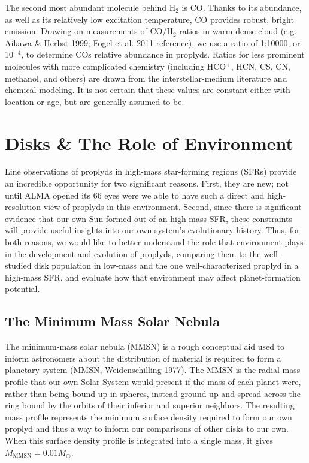 The second most abundant molecule behind H$_2$ is CO. Thanks to its abundance, as well as its relatively low excitation temperature, CO provides robust, bright emission. Drawing on measurements of CO/H$_2$ ratios in warm dense cloud (e.g. Aikawa & Herbst 1999; Fogel et al. 2011 reference), we use a ratio of 1:10000, or 10$^{-4}$, to determine COs relative abundance in proplyds. Ratios for less prominent molecules with more complicated chemistry (including HCO$^+$, HCN, CS, CN, methanol, and others) are drawn from the interstellar-medium literature and chemical modeling. It is not certain that these values are constant either with location or age, but are generally assumed to be.




\section{Disks \& The Role of Environment}

Line observations of proplyds in high-mass star-forming regions (SFRs) provide an incredible opportunity for two significant reasons. First, they are new; not until ALMA opened its 66 eyes were we able to have such a direct and high-resolution view of proplyds in this environment. Second, since there is significant evidence that our own Sun formed out of an high-mass SFR, these constraints will provide useful insights into our own system's evolutionary history. Thus, for both reasons, we would like to better understand the role that environment plays in the development and evolution of proplyds, comparing them to the well-studied disk population in low-mass and the one well-characterized proplyd in a high-mass SFR, and evaluate how that environment may affect planet-formation potential.



\subsection{The Minimum Mass Solar Nebula}

The minimum-mass solar nebula (MMSN) is a rough conceptual aid used to inform astronomers about the distribution of material is required to form a planetary system (MMSN, Weidenschilling 1977). The MMSN is the radial mass profile that our own Solar System would present if the mass of each planet were, rather than being bound up in spheres, instead ground up and spread across the ring bound by the orbits of their inferior and superior neighbors. The resulting mass profile represents the minimum surface density required to form our own proplyd and thus a way to inform our comparisons of other disks to our own. When this surface density profile is integrated into a single mass, it gives $M_\text{MMSN} = 0.01 M_{\odot}$.

